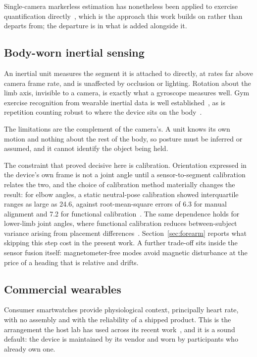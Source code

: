 \documentclass[11pt,a4paper]{article}
\begin{document}
Single-camera markerless estimation has nonetheless been applied to exercise
quantification directly~\cite{exquant}, which is the approach this work builds
on rather than departs from; the departure is in what is added alongside it.

\subsection{Body-worn inertial sensing}

An inertial unit measures the segment it is attached to directly, at rates far
above camera frame rate, and is unaffected by occlusion or lighting. Rotation
about the limb axis, invisible to a camera, is exactly what a gyroscope measures
well. Gym exercise recognition from wearable inertial data is well
established~\cite{gymimu}, as is repetition counting robust to where the device
sits on the body~\cite{exersense}.

The limitations are the complement of the camera's. A unit knows its own motion
and nothing about the rest of the body, so posture must be inferred or assumed,
and it cannot identify the object being held.

The constraint that proved decisive here is calibration. Orientation expressed
in the device's own frame is not a joint angle until a sensor-to-segment
calibration relates the two, and the choice of calibration method materially
changes the result: for elbow angles, a static neutral-pose calibration showed
interquartile ranges as large as 24.6\textdegree, against root-mean-square
errors of 6.3\textdegree{} for manual alignment and 7.2\textdegree{} for
functional calibration~\cite{s2s}. The same dependence holds for lower-limb
joint angles, where functional calibration reduces between-subject variance
arising from placement differences~\cite{s2slower}. Section~\ref{sec:forearm}
reports what skipping this step cost in the present work. A further trade-off
sits inside the sensor fusion itself: magnetometer-free modes avoid magnetic
disturbance at the price of a heading that is relative and drifts.

\subsection{Commercial wearables}

Consumer smartwatches provide physiological context, principally heart rate,
with no assembly and with the reliability of a shipped product. This is the
arrangement the host lab has used across its recent work~\cite{fitpulse,calmme},
and it is a sound default: the device is maintained by its vendor and worn by
participants who already own one.
\end{document}
